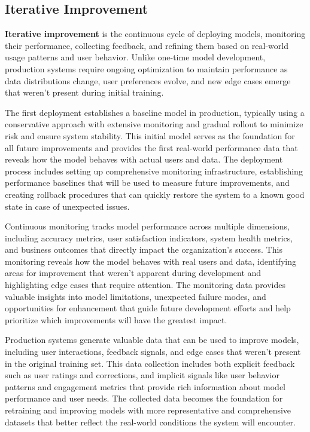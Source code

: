 \subsection{Iterative Improvement}

\textbf{Iterative improvement} is the continuous cycle of deploying models, monitoring their performance, collecting feedback, and refining them based on real-world usage patterns and user behavior. Unlike one-time model development, production systems require ongoing optimization to maintain performance as data distributions change, user preferences evolve, and new edge cases emerge that weren't present during initial training.

The first deployment establishes a baseline model in production, typically using a conservative approach with extensive monitoring and gradual rollout to minimize risk and ensure system stability. This initial model serves as the foundation for all future improvements and provides the first real-world performance data that reveals how the model behaves with actual users and data. The deployment process includes setting up comprehensive monitoring infrastructure, establishing performance baselines that will be used to measure future improvements, and creating rollback procedures that can quickly restore the system to a known good state in case of unexpected issues.

Continuous monitoring tracks model performance across multiple dimensions, including accuracy metrics, user satisfaction indicators, system health metrics, and business outcomes that directly impact the organization's success. This monitoring reveals how the model behaves with real users and data, identifying areas for improvement that weren't apparent during development and highlighting edge cases that require attention. The monitoring data provides valuable insights into model limitations, unexpected failure modes, and opportunities for enhancement that guide future development efforts and help prioritize which improvements will have the greatest impact.

Production systems generate valuable data that can be used to improve models, including user interactions, feedback signals, and edge cases that weren't present in the original training set. This data collection includes both explicit feedback such as user ratings and corrections, and implicit signals like user behavior patterns and engagement metrics that provide rich information about model performance and user needs. The collected data becomes the foundation for retraining and improving models with more representative and comprehensive datasets that better reflect the real-world conditions the system will encounter.

